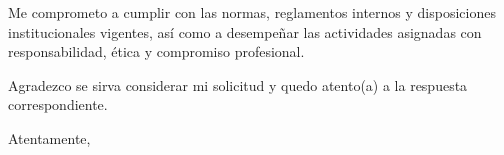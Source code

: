 \documentclass[a4paper,12pt]{article}
\begin{document}
\noindent Me comprometo a cumplir con las normas, reglamentos internos y disposiciones institucionales vigentes, así como a desempeñar las actividades asignadas con responsabilidad, ética y compromiso profesional.

\vspace{0.5cm}

\noindent Agradezco se sirva considerar mi solicitud y quedo atento(a) a la respuesta correspondiente.

\noindent Atentamente,

\vspace{2.5cm}


\noindent{}  

\noindent{}   

\noindent{} 

\noindent{} 
\end{document}
